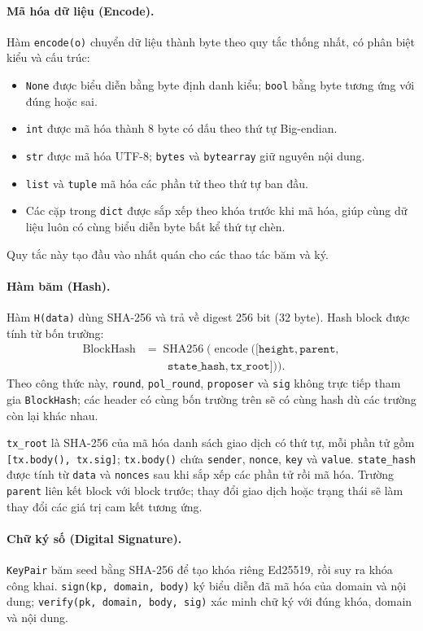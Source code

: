\paragraph{Mã hóa dữ liệu (Encode).} Hàm \texttt{encode(o)} chuyển dữ liệu thành byte theo quy tắc thống nhất, có phân biệt kiểu và cấu trúc:
\begin{itemize}
    \item \texttt{None} được biểu diễn bằng byte định danh kiểu; \texttt{bool} bằng byte tương ứng với đúng hoặc sai.
    \item \texttt{int} được mã hóa thành 8 byte có dấu theo thứ tự Big-endian.
    \item \texttt{str} được mã hóa UTF-8; \texttt{bytes} và \texttt{bytearray} giữ nguyên nội dung.
    \item \texttt{list} và \texttt{tuple} mã hóa các phần tử theo thứ tự ban đầu.
    \item Các cặp trong \texttt{dict} được sắp xếp theo khóa trước khi mã hóa, giúp cùng dữ liệu luôn có cùng biểu diễn byte bất kể thứ tự chèn.
\end{itemize}
Quy tắc này tạo đầu vào nhất quán cho các thao tác băm và ký.
\paragraph{Hàm băm (Hash).} Hàm \texttt{H(data)} dùng SHA-256 và trả về digest 256 bit (32 byte). Hash block được tính từ bốn trường:
\begin{align*}
\mathrm{BlockHash} &= \operatorname{SHA256}(\operatorname{encode}([\texttt{height},\texttt{parent},\\
&\qquad\texttt{state\_hash},\texttt{tx\_root}])).
\end{align*}
Theo công thức này, \texttt{round}, \texttt{pol\_round}, \texttt{proposer} và \texttt{sig} không trực tiếp tham gia \texttt{BlockHash}; các header có cùng bốn trường trên sẽ có cùng hash dù các trường còn lại khác nhau.

\texttt{tx\_root} là SHA-256 của mã hóa danh sách giao dịch có thứ tự, mỗi phần tử gồm \texttt{[tx.body(), tx.sig]}; \texttt{tx.body()} chứa \texttt{sender}, \texttt{nonce}, \texttt{key} và \texttt{value}. \texttt{state\_hash} được tính từ \texttt{data} và \texttt{nonces} sau khi sắp xếp các phần tử rồi mã hóa. Trường \texttt{parent} liên kết block với block trước; thay đổi giao dịch hoặc trạng thái sẽ làm thay đổi các giá trị cam kết tương ứng.
\paragraph{Chữ ký số (Digital Signature).} \texttt{KeyPair} băm seed bằng SHA-256 để tạo khóa riêng Ed25519, rồi suy ra khóa công khai. \texttt{sign(kp, domain, body)} ký biểu diễn đã mã hóa của domain và nội dung; \texttt{verify(pk, domain, body, sig)} xác minh chữ ký với đúng khóa, domain và nội dung.

